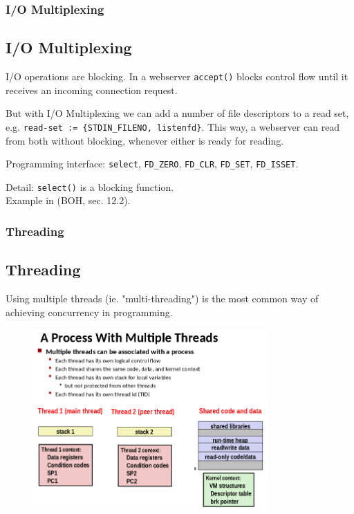 \documentclass[xcolor={usenames,dvipsnames}]{beamer}
\begin{document}
%
%
%
\begin{frame}
\frametitle{I/O Multiplexing}
\subsection{I/O Multiplexing}
I/O operations are blocking. In a webserver \texttt{accept()} blocks control flow
until it receives an incoming connection request.\\\vspace{3mm}

But with I/O Multiplexing we can add a number of file descriptors to a read set,
e.g. \texttt{read-set := \{STDIN\_FILENO, listenfd\}}. This way, a webserver can
read from both without blocking, whenever either is ready for reading.\\\vspace{3mm}

Programming interface: \texttt{select}, \texttt{FD\_ZERO}, \texttt{FD\_CLR},
\texttt{FD\_SET}, \texttt{FD\_ISSET}.\\\vspace{3mm}

Detail: \texttt{select()} is a blocking function.\\
Example in (BOH, sec. 12.2).

\end{frame}



%
%
%
\begin{frame}
\frametitle{Threading}
\subsection{Threading}
Using multiple threads (ie. "multi-threading") is the most common way of achieving
concurrency in programming.\\

\begin{figure}
\includegraphics[width=0.8\textwidth]{images/process-with-multiple-threads.png}
\end{figure}

\end{frame}
\end{document}
